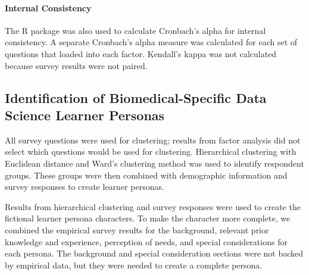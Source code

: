 \documentclass[020-persona\_validation.tex]{subfiles}
\begin{document}
            \paragraph{Internal Consistency}
        
                The  R package was also used to calculate Cronbach's alpha for internal consistency.
                A separate Cronbach's alpha measure was calculated for each set of questions that loaded into each factor.
                Kendall's kappa was not calculated because survey results were not paired.

    \subsection{Identification of Biomedical-Specific Data Science Learner Personas}

        All survey questions were used for clustering;
        results from factor analysis did not select which questions would be used for clustering.
        Hierarchical clustering with Euclidean distance and
        Ward's clustering method was used to identify respondent groups.
        These groups were then combined with demographic information and survey responses to create learner personas.

        Results from hierarchical clustering and survey responses were used to create the
        fictional learner persona characters.
        To make the character more complete,
        we combined the empirical survey results for the
        background,
        relevant prior knowledge and experience,
        perception of needs,
        and special considerations
        for each persona.
        The background and special consideration sections were not backed by empirical data,
        but they were needed to create a complete persona.
\end{document}
